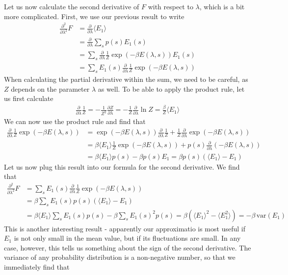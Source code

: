 \documentclass[a4paper, draft]{article}
\theoremstyle{own}
\theoremstyle{remark}
\begin{document}
Let us now calculate the second derivative of $F$ with respect to $\lambda$, which is a bit more complicated. First, we use our previous result to write
\begin{align*}
\frac{\partial^2}{\partial \lambda^2} F &= \frac{\partial}{\partial \lambda} \langle E_1 \rangle \\
&= \frac{\partial}{\partial \lambda} \sum_s p(s) E_1(s) \\
&=  \sum_s \frac{\partial}{\partial \lambda} \frac{1}{Z} \exp(-\beta E(\lambda, s)) E_1(s) \\
&=  \sum_s E_1(s) \frac{\partial}{\partial \lambda} \frac{1}{Z} \exp(-\beta E(\lambda, s)) 
\end{align*}
When calculating the partial derivative within the sum, we need to be careful, as $Z$ depends on the parameter $\lambda$ as well. To be able to apply the product rule, let us first calculate
\begin{align*}
\frac{\partial}{\partial \lambda} \frac{1}{Z} = - \frac{1}{Z^2} \frac{\partial Z }{\partial \lambda} 
= - \frac{1}{Z} \frac{\partial }{\partial \lambda} \ln Z = \frac{\beta}{Z} \langle E_1 \rangle 
\end{align*}
We can now use the product rule and find that
\begin{align*}
\frac{\partial}{\partial \lambda} \frac{1}{Z} \exp(-\beta E(\lambda, s)) &= \exp(-\beta E(\lambda, s)) \frac{\partial}{\partial \lambda} \frac{1}{Z} + \frac{1}{Z} \frac{\partial}{\partial \lambda}  \exp(-\beta E(\lambda, s)) \\
&= \beta \langle E_1 \rangle \frac{1}{Z} \exp(-\beta E(\lambda, s)) + p(s) \frac{\partial}{\partial \lambda} (- \beta  E(\lambda, s)) \\
&= \beta \langle E_1 \rangle p(s) - \beta p(s)  E_1 = \beta p(s) (\langle E_1 \rangle  - E_1)
\end{align*}
Let us now plug this result into our formula for the second derivative. We find that
\begin{align*}
\frac{\partial^2}{\partial \lambda^2} F &= \sum_s E_1(s) \frac{\partial}{\partial \lambda} \frac{1}{Z} \exp(-\beta E(\lambda, s)) \\
&= \beta \sum_s E_1(s)  p(s) (\langle E_1 \rangle  - E_1) \\
&= \beta \langle E_1 \rangle \sum_s E_1(s) p(s) - \beta \sum_s E_1(s)^2 p(s) = \beta (\langle E_1 \rangle^2 - \langle E_1^2 \rangle  ) = - \beta \, \mathrm{var}(E_1) 
\end{align*}
This is another interesting result - apparently our approximatio is most useful if $E_1$ is not only small in the mean value, but if its fluctuations are small. In any case, however, this tells us something about the sign of the second derivative. The variance of any probability distribution is a non-negative number, so that we immediately find that
\end{document}
